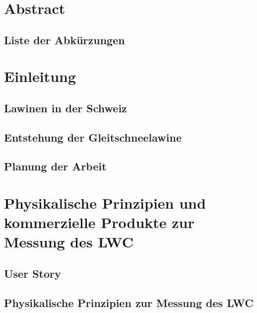 \documentclass[a4paper,12pt]{article}
\begin{document}
\begin{titlepage}
  \end{titlepage}



\pagestyle{empty}
\section*{Abstract}


\newpage
\subsection*{Liste der Abkürzungen}

\newpage
\tableofcontents
\newpage
\pagestyle{fancy}

\setcounter{page}{1}
\section{Einleitung}


\subsection{Lawinen in der Schweiz}


\subsection{Entstehung der Gleitschneelawine}


\subsection{Planung der Arbeit}


\section{Physikalische Prinzipien und kommerzielle Produkte zur Messung des LWC}

\newpage
\subsection{User Story}


\subsection{Physikalische Prinzipien zur Messung des LWC}

\end{document}
